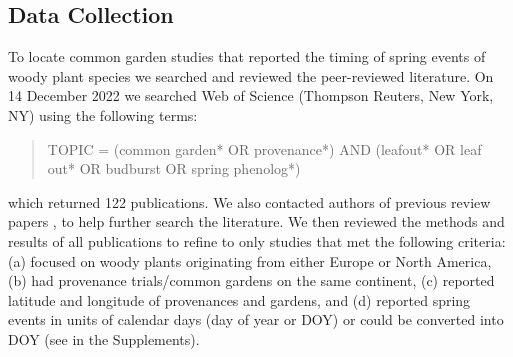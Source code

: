 \documentclass{article}
\begin{document}
\subsection{Data Collection}
To locate common garden studies that reported the timing of spring events of woody plant species we searched and reviewed the peer-reviewed literature. On 14 December 2022 we searched Web of Science (Thompson Reuters, New York, NY) using the following terms:
\begin{quote}
TOPIC = (common garden* OR provenance*) AND (leafout* OR leaf out* OR budburst OR spring phenolog*)
\end{quote}
which returned 122 publications. We also contacted authors of previous review papers \citep{AitkenBemmels16, Alberto13}, to help further search the literature. We then reviewed the methods and results of all publications to refine to only studies that met the following criteria: (a) focused on woody plants originating from either Europe or North America, (b) had provenance trials/common gardens on the same continent, (c) reported latitude and longitude of provenances and gardens, and (d) reported spring events in units of calendar days (day of year or DOY) or could be converted into DOY (see  in the Supplements).
\end{document}
